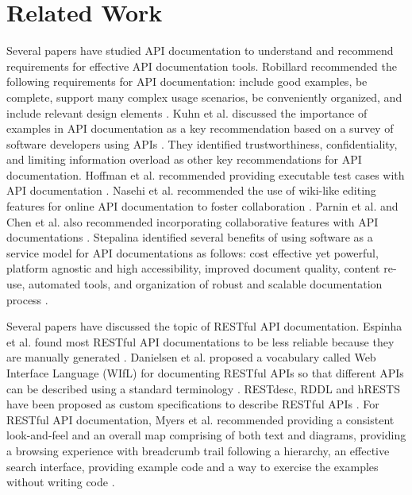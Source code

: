 \documentclass[conference]{IEEEtran}
\begin{document}
\section{Related Work}
Several papers have studied API documentation to understand and recommend requirements for effective API documentation tools. Robillard recommended the following requirements for API documentation: include good examples, be complete, support many complex usage scenarios, be conveniently organized, and include relevant design elements \cite{Robillard_what_makes, Robillard_a_field_study}. Kuhn et al. discussed the importance of examples in API documentation as a key recommendation based on a survey of software developers using APIs \cite{Kuhn_on_designing}. They identified trustworthiness, confidentiality, and limiting information overload as other key recommendations for API documentation. Hoffman et al. recommended providing executable test cases with API documentation \cite{Hoffman_api_documentation}. Nasehi et al. recommended the use of wiki-like editing features for online API documentation to foster collaboration \cite{Nasehi_what_makes}. Parnin et al. and Chen et al. also recommended incorporating collaborative features with API documentations \cite{Parnin_measuring, Chen_who_asked}. Stepalina identified several benefits of using software as a service model for API documentations as follows: cost effective yet powerful, platform agnostic and high accessibility, improved document quality, content re-use, automated tools, and organization of robust and scalable documentation process \cite{Stepalina_saas}.

Several papers have discussed the topic of RESTful API documentation. Espinha et al. found most RESTful API documentations to be less reliable because they are manually generated \cite{Espinha_web}. Danielsen et al. proposed a vocabulary called Web Interface Language (WIfL) for documenting RESTful APIs so that different APIs can be described using a standard terminology \cite{Danielsen_validation}. RESTdesc, RDDL and hRESTS have been proposed as custom specifications to describe RESTful APIs \cite{Verborgh_functional, Mangler_rddl, Kopecky_hrests}. For RESTful API documentation, Myers et al. recommended providing a consistent look-and-feel and an overall map comprising of both text and diagrams, providing a browsing experience with breadcrumb trail following a hierarchy, an effective search interface, providing example code and a way to exercise the examples without writing code \cite{Myers_study}.
\end{document}
